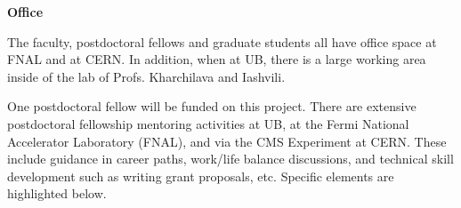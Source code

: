 \documentclass[12pt]{proposalnsf}
\begin{document}
\bigskip
{\bf Office}

The faculty, postdoctoral fellows and graduate students all have
office space at FNAL and at CERN. In addition, when at UB,
there is a large working area inside of the lab of Profs. Kharchilava
and Iashvili. 


\newpage
{}
\renewcommand{\thepage} {D--\arabic{page}}

One postdoctoral fellow will be funded on this project. There are
extensive postdoctoral fellowship mentoring activities at UB, at the
Fermi National Accelerator Laboratory (FNAL), and via the CMS
Experiment at CERN. These include guidance in career paths,
work/life balance discussions, and technical skill development such as
writing grant proposals, etc. Specific elements are highlighted
below. 
\end{document}
